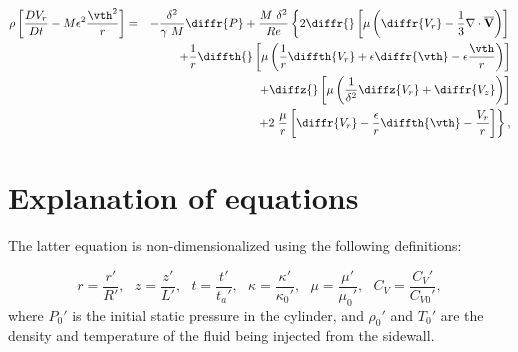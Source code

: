 \begin{eqnarray}
  \rho \left[ \frac{DV_r}{Dt} - M \epsilon^2
    \frac{\vth^2}{r} \right]
  & = & -\frac{\delta^2}{\gamma~ M} \diffr{P}
	+ \frac{M ~\delta^2}{Re} \left\{ 2 \diffr{}
	\left[ \mu \left( \diffr{V_r}
        - \frac{1}{3} {\bf \nabla \cdot \overline{V}}
      \right) \right] \right. \nonumber \\
  & & + \frac{1}{r} \diffth{} \left[ \mu \left(
      \frac{1}{r} \diffth{V_r} + \epsilon \diffr{\vth}
      - \epsilon \frac{\vth}{r} \right) \right] \nonumber \\
  & & + \diffz{} \left[ \mu \left( \frac{1}{\delta^2}
        \diffz{V_r} + \diffr{V_z} \right) \right] \nonumber \\
  & & + 2 \left. \frac{\mu}{r}\left[ \diffr{V_r} -\frac{\epsilon}{r}
      \diffth{\vth} - \frac{V_r}r\right] \right\}, \label{eq:rmom}
\end{eqnarray}


\section{Explanation of equations}

The latter equation is non-dimensionalized using the following definitions:

\[
	r = \frac{r'}{R'}, ~~~
	z = \frac{z'}{L'},~~~
	t = \frac{t'}{t_a'}, ~~~
	\kappa = \frac{\kappa'}{\kappa_0'}, ~~~
	\mu = \frac{\mu'}{\mu_0'} , ~~~
	C_V = \frac{C_V'}{C_{V0}'},
\]
where $P_0'$ is the initial static pressure in the cylinder,
and $\rho_0'$ and $T_0'$ are the density and temperature
of the fluid being injected from the sidewall.

